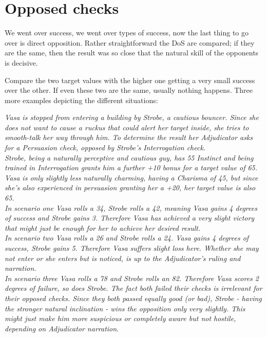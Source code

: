 \documentclass[11pt,a4paper,openany,dvipsnames]{book}
\begin{document}
	\section{Opposed checks}
	\label{sec:opposedchecks}
	We went over success, we went over types of success, now the last thing to go over is direct opposition. Rather straightforward the DoS are compared; if they are the same, then the result was so close that the natural skill of the opponents is decisive.
	\par
    \needspace{30mm}
	Compare the two target values with the higher one getting a very small success over the other. If even these two are the same, usually nothing happens. Three more examples depicting the different situations:
	\begin{exampleblock}
		\itshape
		Vasa is stopped from entering a building by Strobe, a cautious bouncer.
		Since she does not want to cause a ruckus that could alert her target inside,
			she tries to smooth-talk her way through him.
		To determine the result her Adjudicator asks for a Persuasion check,
			opposed by Strobe’s Interrogation check.
		\\%
		Strobe, being a naturally perceptive and cautious guy,
			has 55 Instinct and
			being trained in Interrogation grants him a further +10 bonus for a target value of \emph{65}.
		Vasa is only slightly less naturally charming,
			having a Charisma of 45,
			but since she’s also experienced in persuasion granting her a +20,
			her target value is also \emph{65}.\\
		In scenario one Vasa rolls a 34,
			Strobe rolls a 42,
			meaning Vasa gains 4 degrees of success and Strobe gains 3.
		Therefore Vasa has achieved a very slight victory
			that might just be enough for her to achieve her desired result.\\
		In scenario two Vasa rolls a 26
			and Strobe rolls a 24.
		Vasa gains 4 degrees of success, Strobe gains 5.
		Therefore Vasa suffers slight loss here.
		Whether she may not enter or she enters but is noticed,
			is up to the Adjudicator’s ruling and narration.
		\\%
		In scenario three Vasa rolls a 78 and Strobe rolls an 82.
		Therefore Vasa scores 2 degrees of failure, so does Strobe.
		The fact both failed their checks is irrelevant for their opposed checks.
		Since they both passed equally good (or bad),
			Strobe - having the stronger natural inclination -
			wins the opposition only very slightly.
		This might just make him more suspicious or completely aware but not hostile,
			depending on Adjudicator narration.
	\end{exampleblock}
\end{document}
